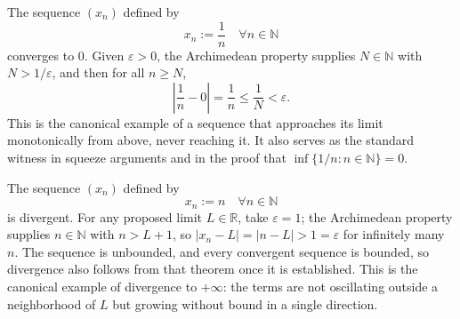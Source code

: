 \begin{example*}
\label{ex:sequence-reciprocal}

The sequence $(x_n)$ defined by
\[
    x_n := \frac{1}{n} \quad \forall n \in \mathbb{N}
\]
converges to $0$. Given $\varepsilon > 0$, the Archimedean property
supplies $N \in \mathbb{N}$ with $N > 1/\varepsilon$, and then for all
$n \ge N$,
\[
    \left|\frac{1}{n} - 0\right| = \frac{1}{n} \le \frac{1}{N} < \varepsilon.
\]
This is the canonical example of a sequence that approaches its limit
monotonically from above, never reaching it. It also serves as the
standard witness in squeeze arguments and in the proof that
$\inf\{1/n : n \in \mathbb{N}\} = 0$.
\end{example*}

\begin{example*}
\label{ex:sequence-natural}

The sequence $(x_n)$ defined by
\[
    x_n := n \quad \forall n \in \mathbb{N}
\]
is divergent. For any proposed limit $L \in \mathbb{R}$, take
$\varepsilon = 1$; the Archimedean property supplies $n \in \mathbb{N}$
with $n > L + 1$, so $|x_n - L| = |n - L| > 1 = \varepsilon$ for
infinitely many $n$. The sequence is unbounded, and every convergent
sequence is bounded, so divergence also follows from that theorem once
it is established. This is the canonical example of divergence to
$+\infty$: the terms are not oscillating outside a neighborhood of $L$
but growing without bound in a single direction.
\end{example*}



































































